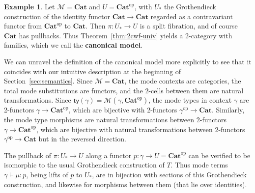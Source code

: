 \documentclass[10pt]{article}
\theoremstyle{definition}
\newtheorem{example}{Example}
\newcommand\op{^{\mathrm{op}}}
\newcommand\Cat{\mathbf{Cat}}
\newcommand\M{\mathcal{M}}
\newcommand\Mty{\mathsf{ty}}
\newcommand\Un{U}
\newcommand\Ub{U_*}
\begin{document}
\begin{example}\label{eg:canon-2cwf}
  Let $\M =\Cat$ and $\Un= \Cat\op$, with $\Ub$ the Grothendieck construction of the identity functor $\Cat \to \Cat$ regarded as a contravariant functor from $\Cat\op$ to $\Cat$.
  Then $\pi:\Ub\to\Un$ is a split fibration, and of course $\Cat$ has pullbacks.
  Thus Theorem~\ref{thm:2cwf-univ} yields a 2-category with families, which we call the \textbf{canonical model}.

  We can unravel the definition of the canonical model more explicitly to see that it coincides with our intuitive description at the beginning of Section~\ref{sec:semantics}.
  Since $\M=\Cat$, the mode contexts are categories, the total mode substitutions are functors, and the 2-cells between them are natural transformations.
  Since $\Mty(\gamma) = \M(\gamma,\Cat\op)$, the mode types in context $\gamma$ are 2-functors $\gamma \to \Cat\op$, which are bijective with 2-functors $\gamma\op\to\Cat$.
  Similarly, the mode type morphisms are natural transformations between 2-functors $\gamma \to \Cat\op$, which are bijective with natural transformations between 2-functors $\gamma\op\to\Cat$ but in the reversed direction.

  The pullback of $\pi:\Ub\to\Un$ along a functor $p:\gamma\to\Un=\Cat\op$ can be verified to be isomorphic to the usual Grothendieck construction of $T$.
  Thus mode terms $\gamma\vdash \mu:p$, being lifts of $p$ to $\Ub$, are in bijection with sections of this Grothendieck construction, and likewise for morphisms between them (that lie over identities).


\end{example}
\end{document}
